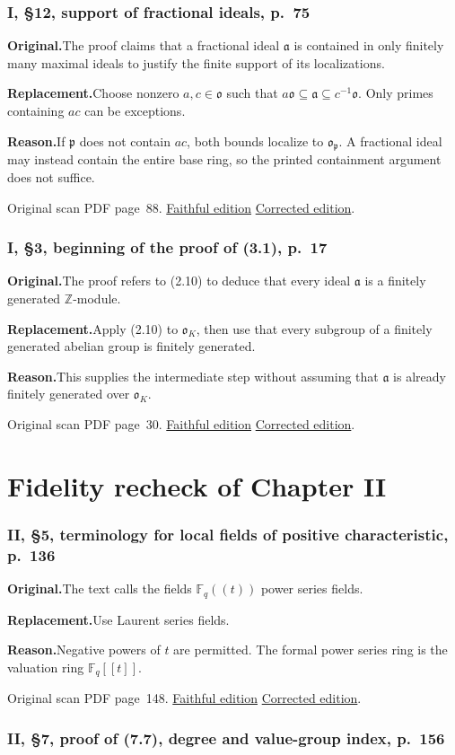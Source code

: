 \documentclass[11pt,a4paper]{article}
\newcommand{\original}{\par\smallskip\noindent\textbf{Original.}\enspace}
\newcommand{\replacement}{\par\smallskip\noindent\textbf{Replacement.}\enspace}
\newcommand{\reason}{\par\smallskip\noindent\textbf{Reason.}\enspace}
\newcommand{\editionlink}[3]{\href{#1\#errata.#2}{#3}}
\newcommand{\location}[2]{%
  \par\smallskip\noindent Original scan PDF page~#2.\enspace
  \editionlink{Neukirch_Faithful.pdf}{#1}{Faithful edition}
  \quad\editionlink{Neukirch_Corrected.pdf}{#1}{Corrected edition}.}
\begin{document}
\setcounter{section}{189}
\section{I, \S12, support of fractional ideals, p.~75}\label{errata:item:190}

\original The proof claims that a fractional ideal $\mathfrak a$ is contained in only finitely many maximal ideals to justify the finite support of its localizations.
\replacement Choose nonzero $a,c\in\mathfrak o$ such that $a\mathfrak o\subseteq\mathfrak a\subseteq c^{-1}\mathfrak o$. Only primes containing $ac$ can be exceptions.
\reason If $\mathfrak p$ does not contain $ac$, both bounds localize to $\mathfrak o_{\mathfrak p}$. A fractional ideal may instead contain the entire base ring, so the printed containment argument does not suffice.
\location{190}{88}

\setcounter{section}{190}
\section{I, \S3, beginning of the proof of (3.1), p.~17}\label{errata:item:191}

\original The proof refers to (2.10) to deduce that every ideal $\mathfrak a$ is a finitely generated $\mathbb Z$-module.
\replacement Apply (2.10) to $\mathfrak o_K$, then use that every subgroup of a finitely generated abelian group is finitely generated.
\reason This supplies the intermediate step without assuming that $\mathfrak a$ is already finitely generated over $\mathfrak o_K$.
\location{191}{30}

\part{Fidelity recheck of Chapter II}
\setcounter{section}{191}
\section{II, \S5, terminology for local fields of positive characteristic, p.~136}\label{errata:item:192}

\original The text calls the fields $\mathbb F_q((t))$ power series fields.
\replacement Use Laurent series fields.
\reason Negative powers of $t$ are permitted. The formal power series ring is the valuation ring $\mathbb F_q[[t]]$.
\location{192}{148}

\setcounter{section}{192}
\section{II, \S7, proof of (7.7), degree and value-group index, p.~156}\label{errata:item:193}
\end{document}
